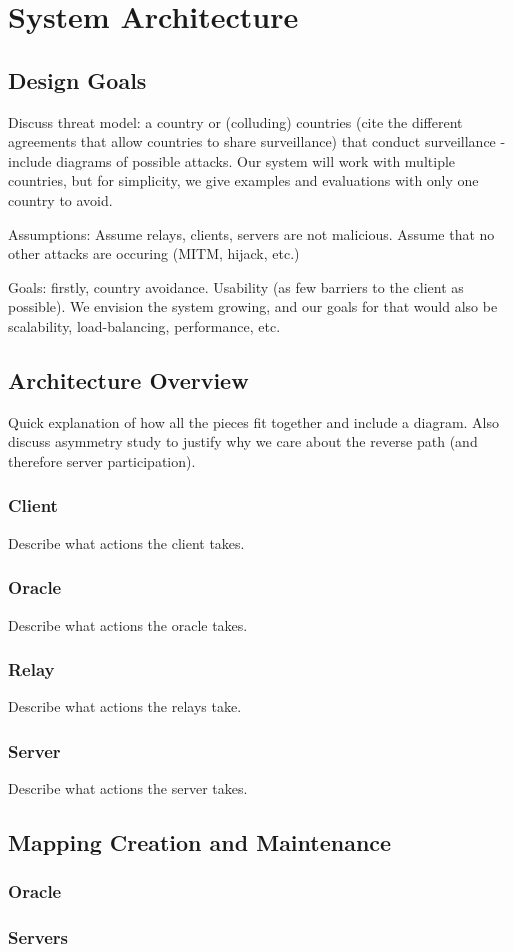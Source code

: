 \section{System Architecture}
\label{architecture}

\subsection{Design Goals}

Discuss threat model: a country or (colluding) countries (cite the different agreements that allow countries to share surveillance) that conduct surveillance - include diagrams of possible attacks.  Our system will work with multiple countries, but for simplicity, we give examples and evaluations with only one country to avoid.

Assumptions: Assume relays, clients, servers are not malicious.  Assume that no other attacks are occuring (MITM, hijack, etc.)  

Goals: firstly, country avoidance.  Usability (as few barriers to the client as possible).  We envision the system growing, and our goals for that would also be scalability, load-balancing, performance, etc.

\subsection{Architecture Overview}

Quick explanation of how all the pieces fit together and include a diagram.  Also discuss asymmetry study to justify why we care about the reverse path (and therefore server participation).

\subsubsection{Client} Describe what actions the client takes.

\subsubsection{Oracle} Describe what actions the oracle takes.

\subsubsection{Relay} Describe what actions the relays take.

\subsubsection{Server} Describe what actions the server takes.

\subsection{Mapping Creation and Maintenance}

\subsubsection{Oracle}

\subsubsection{Servers}
